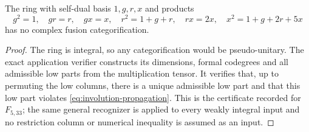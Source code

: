 \begin{corollary}\label{prop:42}
The ring with self-dual basis $1,g,r,x$ and products
\[
g^2=1,\quad gr=r,\quad gx=x,\quad r^2=1+g+r,\quad
rx=2x,\quad x^2=1+g+2r+5x
\]
has no complex fusion categorification.
\end{corollary}
\begin{proof}
The ring is integral, so any categorification would be pseudo-unitary.
The exact application verifier constructs its dimensions, formal
codegrees and all admissible low parts from the multiplication tensor.
It verifies that, up to permuting the low columns, there is a unique
admissible low part and that this low part violates
\eqref{eq:involution-propagation}. This is the certificate recorded for
$F_{5,33}$; the same general recognizer is applied to every weakly
integral input and no restriction column or numerical inequality is
assumed as an input.
\end{proof}

